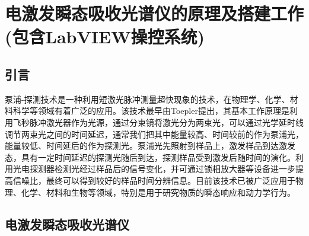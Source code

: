 
\chapter{电激发瞬态吸收光谱仪的原理及搭建工作(包含LabVIEW操控系统)}
\section{引言}
泵浦-探测技术是一种利用短激光脉冲测量超快现象的技术，在物理学、化学、材料科学等领域有着广泛的应用。该技术最早由Toepler\cite{toepler1867optische}提出，其基本工作原理是利用飞秒脉冲激光器作为光源，通过分束镜将激光分为两束光，可以通过光学延时线调节两束光之间的时间延迟，通常我们把其中能量较高、时间较前的作为泵浦光，能量较低、时间延后的作为探测光。泵浦光先照射到样品上，激发样品到达激发态，具有一定时间延迟的探测光随后到达，探测样品受到激发后随时间的演化。利用光电探测器检测光经过样品后的信号变化，并可通过锁相放大器等设备进一步提高信噪比，最终可以得到较好的样品时间分辨信息。目前该技术已被广泛应用于物理、化学、材料和生物等领域，特别是用于研究物质的瞬态响应和动力学行为。
\section{电激发瞬态吸收光谱仪}
